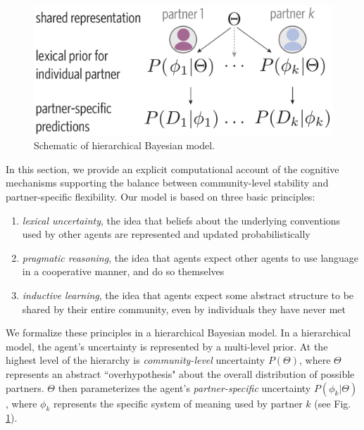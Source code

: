 
\begin{figure}[t!]
\includegraphics[scale=0.4]{./figures/task1_model.pdf}
\caption{Schematic of hierarchical Bayesian model.}
\label{fig:model_schematic}
\end{figure}


In this section, we provide an explicit computational account of the cognitive mechanisms supporting the balance between community-level stability and partner-specific flexibility.
Our model is based on three basic principles: 

\begin{enumerate}
\item \emph{lexical uncertainty}, the idea that beliefs about the underlying conventions used by other agents are represented and updated probabilistically \cite{bergen_pragmatic_2016}
\item \emph{pragmatic reasoning}, the idea that agents expect other agents to use language in a cooperative manner, and do so themselves  \cite{GoodmanFrank16_RSATiCS}
\item \emph{inductive learning}, the idea that agents expect some abstract structure to be shared by their entire community, even by individuals they have never met \cite{}
\end{enumerate}

We formalize these principles in a hierarchical Bayesian model.
In a hierarchical model, the agent's uncertainty is represented by a multi-level prior. 
At the highest level of the hierarchy is \emph{community-level} uncertainty $P(\Theta)$, where $\Theta$ represents an abstract ``overhypothesis" about the overall distribution of possible partners. 
$\Theta$ then parameterizes the agent's \emph{partner-specific} uncertainty $P(\phi_{k} | \Theta)$, where $\phi_k$ represents the specific system of meaning used by partner $k$ (see Fig. \ref{fig:model_schematic}). 

